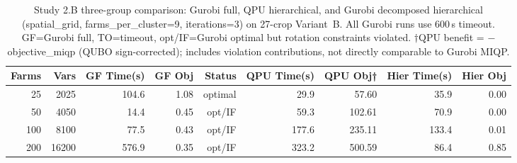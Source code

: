 \begin{table}[htbp]
\centering
\caption{Study 2.B three-group comparison: Gurobi full, QPU hierarchical, and Gurobi decomposed hierarchical (spatial\_grid, farms\_per\_cluster=9, iterations=3) on 27-crop Variant~B. All Gurobi runs use 600\,s timeout.  GF=Gurobi full, TO=timeout, opt/IF=Gurobi optimal but rotation constraints violated.  $\dagger$QPU benefit = $-$objective\_miqp (QUBO sign-corrected); includes violation contributions, not directly comparable to Gurobi MIQP.}
\label{tab:study2b_three_group}
\begin{tabular}{rrrrrrrrr}
\toprule
    \textbf{Farms} & \textbf{Vars} & \textbf{GF Time(s)} & \textbf{GF Obj} & \textbf{Status} & \textbf{QPU Time(s)} & \textbf{QPU Obj†} & \textbf{Hier Time(s)} & \textbf{Hier Obj} \\ \midrule
    25 & 2025 & 104.6 & 1.08 & optimal & 29.9 & 57.60 & 35.9 & 0.00 \\
    50 & 4050 & 14.4 & 0.45 & opt/IF & 59.3 & 102.61 & 70.9 & 0.00 \\
    100 & 8100 & 77.5 & 0.43 & opt/IF & 177.6 & 235.11 & 133.4 & 0.01 \\
    200 & 16200 & 576.9 & 0.35 & opt/IF & 323.2 & 500.59 & 86.4 & 0.85 \\
\bottomrule
\end{tabular}

\end{table}
